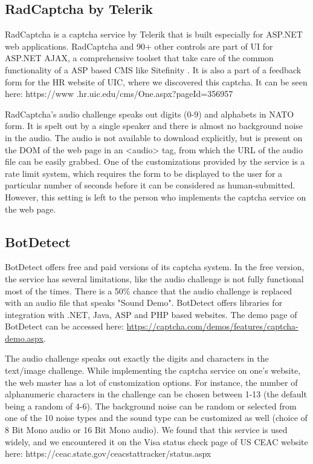 \subsection{RadCaptcha by Telerik}

RadCaptcha is a captcha service by Telerik that is built especially for ASP.NET 
web applications. RadCaptcha and 90+ other controls are part of UI for ASP.NET AJAX, 
a comprehensive toolset that take care of the common functionality of a ASP based 
CMS like Sitefinity \cite{radcaptcha}. It is also a part of a feedback form for the 
HR website of UIC, where we discovered this captcha. It can be seen here: https://www
.hr.uic.edu/cms/One.aspx?pageId=356957\newline

RadCaptcha's audio challenge speaks out digits (0-9) and alphabets in NATO form. It is 
spelt out by a single speaker and there is almost no background noise in the audio. The 
audio is not available to download explicitly, but is present on the DOM of the web page 
in an <audio> tag, from which the URL of the audio file can be easily grabbed. One of the 
customizations provided by the service is a rate limit system, which requires the form to 
be displayed to the user for a particular number of seconds before it can be considered as 
human-submitted. However, this setting is left to the person who implements the captcha 
service on the web page.

\subsection{BotDetect}

BotDetect offers free and paid versions of its captcha system. In the free version, the 
service has several limitations, like the audio challenge is not fully functional most of 
the times. There is a 50\% chance that the audio challenge is replaced with an audio file 
that speaks "Sound Demo". BotDetect offers libraries for integration with .NET, Java, ASP 
and PHP based websites. The demo page of BotDetect can be accessed here: 
\url{https://captcha.com/demos/features/captcha-demo.aspx}.

The audio challenge speaks out exactly the digits and characters in the text/image challenge. 
While implementing the captcha service on one's website, the web master has a lot of customization 
options. For instance, the number of alphanumeric characters in the challenge can be chosen between 
1-13 (the default being a random of 4-6). The background noise can be random or selected from one of 
the 10 noise types and the sound type can be customized as well (choice of 8 Bit Mono audio or 16 Bit 
Mono audio). We found that this service is used widely, and we encountered it on the Visa status check 
page of US CEAC website here: https://ceac.state.gov/ceacstattracker/status.aspx \newline

